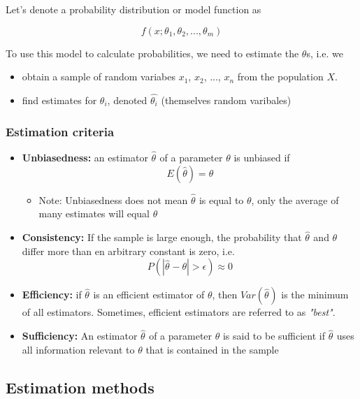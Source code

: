 \documentclass[11pt]{article}
\providecommand{\tightlist}{%
      \setlength{\itemsep}{0pt}\setlength{\parskip}{0pt}}
\begin{document}
Let's denote a probability distribution or model function as

\[ f(x; \theta_1, \theta_2, ..., \theta_m) \]

To use this model to calculate probabilities, we need to estimate the
\(\theta\)s, i.e. we

\begin{itemize}
\tightlist
\item
  obtain a sample of random variabes \(x_1\), \(x_2\), ..., \(x_n\) from
  the population \(X\).
\item
  find estimates for \(\theta_i\), denoted \(\hat{\theta_i}\)
  (themselves random varibales)
\end{itemize}

    \subsubsection{Estimation criteria}\label{estimation-criteria}

\begin{itemize}
\item
  \textbf{Unbiasedness:} an estimator \(\hat{\theta_{}}\) of a parameter
  \(\theta\) is unbiased if \[E(\hat{\theta})=\theta\]

  \begin{itemize}
  \tightlist
  \item
    Note: Unbiasedness does not mean \(\hat{\theta_{}}\) is equal to
    \(\theta\), only the average of many estimates will equal \(\theta\)
  \end{itemize}
\item
  \textbf{Consistency:} If the sample is large enough, the probability
  that \(\hat{\theta_{}}\) and \(\theta\) differ more than en arbitrary
  constant is zero, i.e.
  \[ P \left( \left| \hat{\theta_{}}-\theta \right| > \epsilon \right) \approx 0 \]
\item
  \textbf{Efficiency:} if \(\hat{\theta_{}}\) is an efficient estimator
  of \(\theta\), then \(Var(\hat{\theta_{}})\) is the minimum of all
  estimators. Sometimes, efficient estimators are referred to as
  \emph{"best"}.
\item
  \textbf{Sufficiency:} An estimator \(\hat{\theta_{}}\) of a parameter
  \(\theta\) is said to be sufficient if \(\hat{\theta_{}}\) uses all
  information relevant to \(\theta\) that is contained in the sample
\end{itemize}

    \subsection{Estimation methods}\label{estimation-methods}
\end{document}
